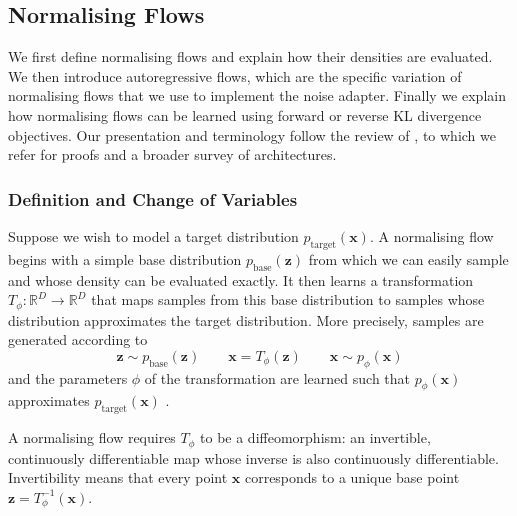 \documentclass[12pt,a4paper]{report}
\begin{document}
\subsection{Normalising Flows}
\label{subsec:normalising_flows}
We first define normalising flows and explain how their densities are evaluated. We then introduce autoregressive flows, which are the specific variation of normalising flows that we use to implement the noise adapter. Finally we explain how normalising flows can be learned using forward or reverse KL divergence objectives. Our presentation and terminology follow the review of \textcite{NF_survey}, to which we refer for proofs and a broader survey of architectures.

\subsubsection{Definition and Change of Variables}
\label{subsubsec:definition_and_change_of_variables}
Suppose we wish to model a target distribution $p_{\mathrm{target}}(\mathbf{x})$. A normalising flow begins with a simple base distribution $p_{\mathrm{base}}(\mathbf{z})$ from which we can easily sample and whose density can be evaluated exactly. It then learns a transformation $T_{\phi}:\mathbb{R}^{D}\rightarrow\mathbb{R}^{D}$ that maps samples from this base distribution to samples whose distribution approximates the target distribution. More precisely, samples are generated according to
\begin{equation}
\mathbf{z}
\sim
p_{\mathrm{base}}(\mathbf{z})
\qquad
\mathbf{x}
=
T_{\phi}(\mathbf{z})
\qquad
\mathbf{x}
\sim
p_{\phi}(\mathbf{x})
\label{eq:normalising_flow_transformation}
\end{equation}
and the parameters $\phi$ of the transformation are learned such that $p_{\phi}(\mathbf{x})$ approximates $p_{\mathrm{target}}(\mathbf{x})$ \parencite{NF_survey}.

A normalising flow requires $T_{\phi}$ to be a diffeomorphism: an invertible, continuously differentiable map whose inverse is also continuously differentiable. Invertibility means that every point $\mathbf{x}$ corresponds to a unique base point $\mathbf{z}=T_{\phi}^{-1}(\mathbf{x})$.
\end{document}
